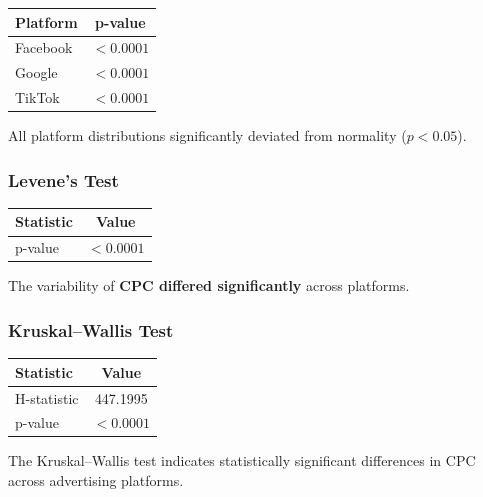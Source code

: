 \begin{table}[H]
	\centering
	\begin{tabular}{lc}
		\toprule
		Platform & p-value \\
		\midrule
		Facebook & $<0.0001$ \\
		Google & $<0.0001$ \\
		TikTok & $<0.0001$ \\
		\bottomrule
	\end{tabular}
\end{table}

All platform distributions significantly deviated from normality ($p<0.05$).

\vspace{0.3cm}

\subsubsection{Levene's Test}

\begin{table}[H]
	\centering
	\begin{tabular}{lc}
		\toprule
		Statistic & Value \\
		\midrule
		p-value & $<0.0001$ \\
		\bottomrule
	\end{tabular}
\end{table}

The variability of \textbf{CPC differed significantly} across platforms.

\vspace{0.3cm}

\subsubsection{Kruskal--Wallis Test}

\begin{table}[H]
	\centering
	\begin{tabular}{lc}
		\toprule
		Statistic & Value \\
		\midrule
		H-statistic & 447.1995 \\
		p-value & $<0.0001$ \\
		\bottomrule
	\end{tabular}
\end{table}

The Kruskal--Wallis test indicates statistically significant differences in CPC across advertising platforms.

\vspace{0.3cm}

